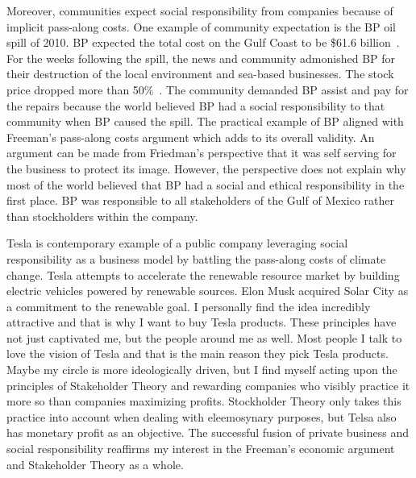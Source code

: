 \documentclass[12pt]{article}
\begin{document}
Moreover, communities expect social responsibility from companies because of
implicit pass-along costs. One example of community expectation is the BP oil
spill of 2010. BP expected the total cost on the Gulf Coast to be \$61.6
billion~\cite{bp_spill}. For the weeks following the spill, the news and
community admonished BP for their destruction of the local environment and
sea-based businesses. The stock price dropped more than 50\%~\cite{stock}. The
community demanded BP assist and pay for the repairs because the world believed
BP had a social responsibility to that community when BP caused the spill. The
practical example of BP aligned with Freeman's pass-along costs argument which
adds to its overall validity. An argument can be made from Friedman's
perspective that it was self serving for the business to protect its image.
However, the perspective does not explain why most of the world believed that BP
had a social and ethical responsibility in the first place. BP was responsible
to all stakeholders of the Gulf of Mexico rather than stockholders within the
company.

Tesla is contemporary example of a public company leveraging social
responsibility as a business model by battling the pass-along costs of climate
change. Tesla attempts to accelerate the renewable resource market by building
electric vehicles powered by renewable sources. Elon Musk acquired Solar City as
a commitment to the renewable goal. I personally find the idea incredibly
attractive and that is why I want to buy Tesla products. These principles have
not just captivated me, but the people around me as well. Most people I talk to
love the vision of Tesla and that is the main reason they pick Tesla products.
Maybe my circle is more ideologically driven, but I find myself acting upon the
principles of Stakeholder Theory and rewarding companies who visibly practice it
more so than companies maximizing profits.  Stockholder Theory only takes this
practice into account when dealing with eleemosynary purposes, but Telsa also
has monetary profit as an objective. The successful fusion of private business
and social responsibility reaffirms my interest in the Freeman's economic
argument and Stakeholder Theory as a whole.




\end{document}
